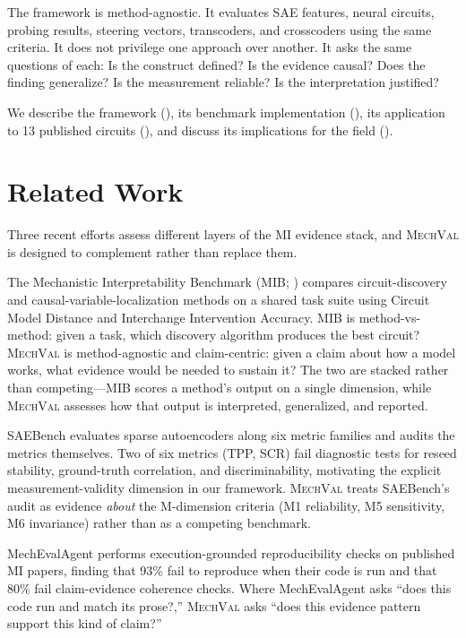 \documentclass[10pt]{article}
\newcommand{\mechval}{\textsc{MechVal}}
\begin{document}
The framework is method-agnostic. It evaluates SAE features, neural circuits, probing results, steering vectors, transcoders, and crosscoders using the same criteria. It does not privilege one approach over another. It asks the same questions of each: Is the construct defined? Is the evidence causal? Does the finding generalize? Is the measurement reliable? Is the interpretation justified?

We describe the framework (), its benchmark implementation (), its application to 13 published circuits (), and discuss its implications for the field ().

\section{Related Work}
\label{sec:related}

Three recent efforts assess different layers of the MI evidence stack, and \mechval{} is designed to complement rather than replace them.

The Mechanistic Interpretability Benchmark (MIB; \citealp{mueller2025mib}) compares circuit-discovery and causal-variable-localization methods on a shared task suite using Circuit Model Distance and Interchange Intervention Accuracy. MIB is method-vs-method: given a task, which discovery algorithm produces the best circuit? \mechval{} is method-agnostic and claim-centric: given a claim about how a model works, what evidence would be needed to sustain it? The two are stacked rather than competing---MIB scores a method's output on a single dimension, while \mechval{} assesses how that output is interpreted, generalized, and reported.

SAEBench \citep{karvonen2025saebench} evaluates sparse autoencoders along six metric families and audits the metrics themselves. Two of six metrics (TPP, SCR) fail diagnostic tests for reseed stability, ground-truth correlation, and discriminability, motivating the explicit measurement-validity dimension in our framework. \mechval{} treats SAEBench's audit as evidence \emph{about} the M-dimension criteria (M1 reliability, M5 sensitivity, M6 invariance) rather than as a competing benchmark.

MechEvalAgent \citep{bai2026mecheval} performs execution-grounded reproducibility checks on published MI papers, finding that 93\% fail to reproduce when their code is run and that 80\% fail claim-evidence coherence checks. Where MechEvalAgent asks ``does this code run and match its prose?,'' \mechval{} asks ``does this evidence pattern support this kind of claim?''
\end{document}

